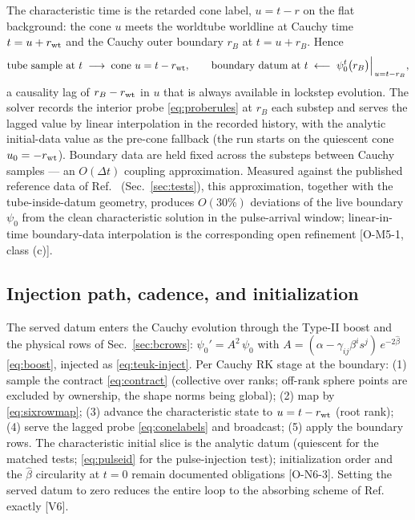 \begin{nfblock}
The characteristic time is the retarded cone label, $u = t - r$ on the
flat background: the cone $u$ meets the worldtube worldline at Cauchy
time $t = u + r_{\rm wt}$ and the Cauchy outer boundary $r_B$ at
$t = u + r_B$. Hence
\begin{equation}
\text{tube sample at } t \;\longrightarrow\; \text{cone } u = t -
r_{\rm wt},
\qquad
\text{boundary datum at } t \;\longleftarrow\;
\psi_0^t\big(r_B\big)\Big|_{\,u = t - r_B},
\label{eq:conelabels}
\end{equation}
a causality lag of $r_B - r_{\rm wt}$ in $u$ that is always available
in lockstep evolution. The solver records the interior probe
\eqref{eq:proberules} at $r_B$ each substep and serves the lagged value
by linear interpolation in the recorded history, with the analytic
initial-data value as the pre-cone fallback (the run starts on the
quiescent cone $u_0 = -r_{\rm wt}$). Boundary data are held fixed
across the substeps between Cauchy samples --- an $O(\Delta t)$
coupling approximation. Measured against the published reference data
of Ref.~\cite{Ma:2023qjn} (Sec.~\ref{sec:tests}), this approximation,
together with the tube-inside-datum geometry, produces $O(30\%)$
deviations of the live boundary $\psi_0$ from the clean characteristic
solution in the pulse-arrival window; linear-in-time boundary-data
interpolation is the corresponding open refinement [O-M5-1, class (c)].
\end{nfblock}

\subsection{Injection path, cadence, and initialization}
\label{sec:cadence}

\begin{nfblock}
The served datum enters the Cauchy evolution through the Type-II boost
and the physical rows of Sec.~\ref{sec:bcrows}:
$\psi_0' = A^2\,\psi_0$ with
$A = (\alpha - \gamma_{ij}\beta^is^j)\,e^{-2\hat\beta}$
\eqref{eq:boost}, injected as \eqref{eq:teuk-inject}. Per Cauchy RK
stage at the boundary: (1) sample the contract \eqref{eq:contract}
(collective over ranks; off-rank sphere points are excluded by
ownership, the shape norms being global); (2) map by
\eqref{eq:sixrowmap}; (3) advance the characteristic state to
$u = t - r_{\rm wt}$ (root rank); (4) serve the lagged probe
\eqref{eq:conelabels} and broadcast; (5) apply the boundary rows. The
characteristic initial slice is the analytic datum (quiescent for the
matched tests; \eqref{eq:pulseid} for the pulse-injection test);
initialization order and the $\hat\beta$ circularity at $t=0$ remain
documented obligations [O-N6-3]. Setting the served datum to zero
reduces the entire loop to the absorbing scheme of
Ref.~\cite{Ruiz:2010qj} exactly [V6].
\end{nfblock}


